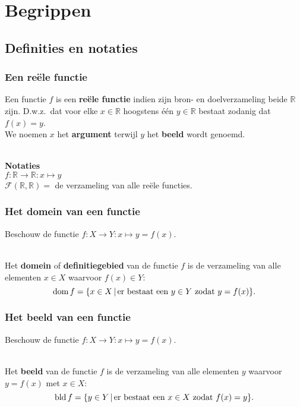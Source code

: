 \section{Begrippen}
\frame{\tableofcontents[currentsection]}

\subsection{Definities en notaties}

\begin{frame}
\frametitle{Een re\"ele functie}
\pause
\begin{definitie} 
Een functie $f$ is een {\bfseries re\"ele functie} indien zijn bron- en doelverzameling beide $\mathbb{R}$ zijn. D.w.z.\ dat voor elke $x \in \mathbb{R}$ hoogstens \'e\'en $ y \in \mathbb{R}$ bestaat zodanig dat $f(x) =y $.\\
We noemen $x$ het {\bfseries argument} terwijl $y$ het {\bfseries beeld} wordt genoemd.
\end{definitie}
~\\
\pause
{\bfseries Notaties} ~\\
$f : \mathbb{R} \rightarrow \mathbb{R} : x \mapsto y$\\
${\mathcal{F}}(\mathbb{R},\mathbb{R}) =$ de verzameling van alle re\"ele functies.
\end{frame}

\begin{frame}
\frametitle{Het domein van een functie} 
\pause
\begin{definitie} 
Beschouw de functie $f:X\rightarrow Y:x\mapsto y=f(x)$.\\~
\pause

Het {\bfseries domein} of {\bfseries definitiegebied} van de functie $f$ is de verzameling van alle elementen $x\in X$ waarvoor $f(x) \in Y$:
\[\mbox{dom\,} f = \{x \in X \,|\, \mbox{er bestaat een } y \in Y \mbox{ zodat } y=f(x)\}.\]
\end{definitie}
\end{frame}

\begin{frame}
\frametitle{Het beeld van een functie} 
\pause
\begin{definitie}
	Beschouw de functie $f:X\rightarrow Y:x\mapsto y=f(x)$.\\~
	\pause
	
	Het {\bfseries beeld} van de functie $f$ is de verzameling van alle elementen $y$ waarvoor \mbox{$y=f(x)$} met $x \in X$:
	\[\mbox{bld\,} f = \{y \in Y \,|\, \mbox{er bestaat een } x \in X \mbox{ zodat } f(x)=y \}.\]
\end{definitie}
\end{frame}

